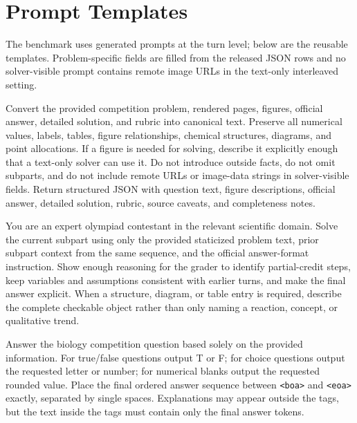 \documentclass[11pt]{article}
\begin{document}
\section{Prompt Templates}
\label{app:prompts}
The benchmark uses generated prompts at the turn level; below are the reusable templates.
Problem-specific fields are filled from the released JSON rows and no solver-visible prompt contains remote image URLs in the text-only interleaved setting.

\begin{tcolorbox}[
  title={Staticization prompt},
  colback=gray!3,
  colframe=black!35,
  boxrule=0.6pt,
  arc=1.5mm,
  left=1.5mm,right=1.5mm,top=1mm,bottom=1mm
]
\footnotesize
Convert the provided competition problem, rendered pages, figures, official answer, detailed solution, and rubric into canonical text.
Preserve all numerical values, labels, tables, figure relationships, chemical structures, diagrams, and point allocations.
If a figure is needed for solving, describe it explicitly enough that a text-only solver can use it.
Do not introduce outside facts, do not omit subparts, and do not include remote URLs or image-data strings in solver-visible fields.
Return structured JSON with question text, figure descriptions, official answer, detailed solution, rubric, source caveats, and completeness notes.
\end{tcolorbox}

\begin{tcolorbox}[
  title={Interleaved solver prompt for open-ended items},
  colback=gray!3,
  colframe=black!35,
  boxrule=0.6pt,
  arc=1.5mm,
  left=1.5mm,right=1.5mm,top=1mm,bottom=1mm
]
\footnotesize
You are an expert olympiad contestant in the relevant scientific domain.
Solve the current subpart using only the provided staticized problem text, prior subpart context from the same sequence, and the official answer-format instruction.
Show enough reasoning for the grader to identify partial-credit steps, keep variables and assumptions consistent with earlier turns, and make the final answer explicit.
When a structure, diagram, or table entry is required, describe the complete checkable object rather than only naming a reaction, concept, or qualitative trend.
\end{tcolorbox}

\begin{tcolorbox}[
  title={IBO objective-key prompt},
  colback=gray!3,
  colframe=black!35,
  boxrule=0.6pt,
  arc=1.5mm,
  left=1.5mm,right=1.5mm,top=1mm,bottom=1mm
]
\footnotesize
Answer the biology competition question based solely on the provided information.
For true/false questions output T or F; for choice questions output the requested letter or number; for numerical blanks output the requested rounded value.
Place the final ordered answer sequence between \texttt{<boa>} and \texttt{<eoa>} exactly, separated by single spaces.
Explanations may appear outside the tags, but the text inside the tags must contain only the final answer tokens.
\end{tcolorbox}
\end{document}
